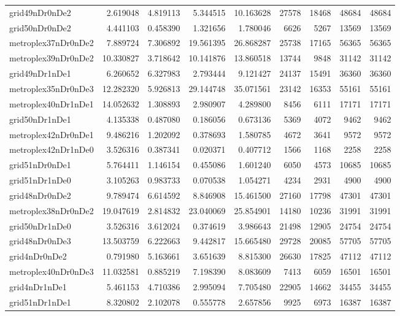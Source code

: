 \begin{longtable}{|l|r|r|r|r|r|r|r|r|}
grid49nDr0nDe2 & 2.619048 & 4.819113 & 5.344515 & 10.163628 & 27578 & 18468 & 48684 & 48684 \\
grid50nDr0nDe2 & 4.441103 & 0.458390 & 1.321656 & 1.780046 & 6626 & 5267 & 13569 & 13569 \\
metroplex37nDr0nDe2 & 7.889724 & 7.306892 & 19.561395 & 26.868287 & 25738 & 17165 & 56365 & 56365 \\
metroplex39nDr0nDe2 & 10.330827 & 3.718642 & 10.141876 & 13.860518 & 13744 & 9848 & 31142 & 31142 \\
grid49nDr1nDe1 & 6.260652 & 6.327983 & 2.793444 & 9.121427 & 24137 & 15491 & 36360 & 36360 \\
metroplex35nDr0nDe3 & 12.282320 & 5.926813 & 29.144748 & 35.071561 & 23142 & 16353 & 55161 & 55161 \\
metroplex40nDr1nDe1 & 14.052632 & 1.308893 & 2.980907 & 4.289800 & 8456 & 6111 & 17171 & 17171 \\
grid50nDr1nDe1 & 4.135338 & 0.487080 & 0.186056 & 0.673136 & 5369 & 4072 & 9462 & 9462 \\
metroplex42nDr0nDe1 & 9.486216 & 1.202092 & 0.378693 & 1.580785 & 4672 & 3641 & 9572 & 9572 \\
metroplex42nDr1nDe0 & 3.526316 & 0.387341 & 0.020371 & 0.407712 & 1566 & 1168 & 2258 & 2258 \\
grid51nDr0nDe1 & 5.764411 & 1.146154 & 0.455086 & 1.601240 & 6050 & 4573 & 10685 & 10685 \\
grid51nDr1nDe0 & 3.105263 & 0.983733 & 0.070538 & 1.054271 & 4234 & 2931 & 4900 & 4900 \\
grid48nDr0nDe2 & 9.789474 & 6.614592 & 8.846908 & 15.461500 & 27160 & 17798 & 47301 & 47301 \\
metroplex38nDr0nDe2 & 19.047619 & 2.814832 & 23.040069 & 25.854901 & 14180 & 10236 & 31991 & 31991 \\
grid50nDr1nDe0 & 3.526316 & 3.612024 & 0.374619 & 3.986643 & 21498 & 12905 & 24754 & 24754 \\
grid48nDr0nDe3 & 13.503759 & 6.222663 & 9.442817 & 15.665480 & 29728 & 20085 & 57705 & 57705 \\
grid4nDr0nDe2 & 0.791980 & 5.163661 & 3.651639 & 8.815300 & 26630 & 17825 & 47112 & 47112 \\
metroplex40nDr0nDe3 & 11.032581 & 0.885219 & 7.198390 & 8.083609 & 7413 & 6059 & 16501 & 16501 \\
grid4nDr1nDe1 & 5.461153 & 4.710386 & 2.995094 & 7.705480 & 22905 & 14662 & 34455 & 34455 \\
grid51nDr1nDe1 & 8.320802 & 2.102078 & 0.555778 & 2.657856 & 9925 & 6973 & 16387 & 16387 \\

\end{longtable}
